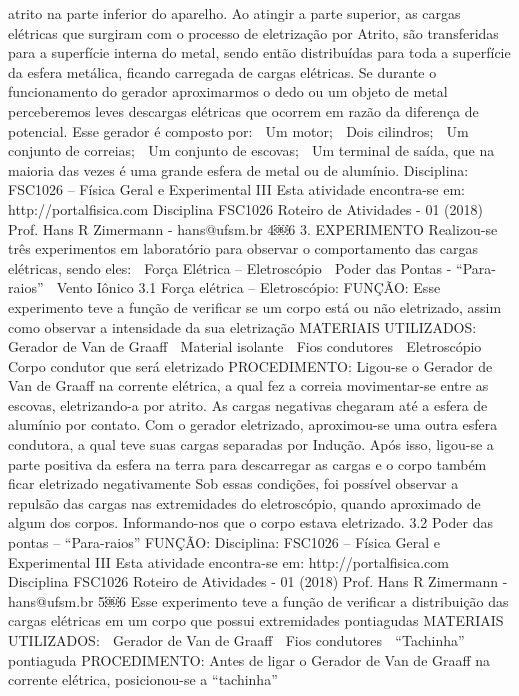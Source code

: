atrito na parte inferior do aparelho. Ao atingir a parte superior, as cargas elétricas que surgiram com 
o processo de eletrização por Atrito, são transferidas para a superfície interna do metal, sendo então 
distribuídas para toda a superfície da esfera metálica, ficando carregada de cargas elétricas. Se 
durante o funcionamento do gerador aproximarmos o dedo ou um objeto de metal perceberemos 
leves descargas elétricas que ocorrem em razão da diferença de potencial. 
Esse gerador é composto por:
 Um motor; 
 Dois cilindros; 
 Um conjunto de correias; 
 Um conjunto de escovas; 
 Um terminal de saída, que na maioria das vezes é uma grande esfera de metal ou de alumínio.
Disciplina: FSC1026 – Física Geral e Experimental III
Esta atividade encontra-se em: http://portalfisica.com Disciplina FSC1026
Roteiro de Atividades - 01 (2018) 
Prof. Hans R Zimermann - hans@ufsm.br
4￼6
3. EXPERIMENTO
Realizou-se três experimentos em laboratório para observar o comportamento das cargas elétricas, 
sendo eles:
 Força Elétrica – Eletroscópio
 Poder das Pontas - “Para-raios”
 Vento Iônico
3.1 Força elétrica – Eletroscópio:
FUNÇÃO:
Esse experimento teve a função de verificar se um corpo está ou não eletrizado, assim como 
observar a intensidade da sua eletrização
MATERIAIS UTILIZADOS: 
 Gerador de Van de Graaff
 Material isolante
 Fios condutores
 Eletroscópio
 Corpo condutor que será eletrizado
PROCEDIMENTO: 
Ligou-se o Gerador de Van de Graaff na corrente elétrica, a qual fez a correia movimentar-se entre 
as escovas, eletrizando-a por atrito. As cargas negativas chegaram até a esfera de alumínio por 
contato.
Com o gerador eletrizado, aproximou-se uma outra esfera condutora, a qual teve suas cargas 
separadas por Indução. Após isso, ligou-se a parte positiva da esfera na terra para descarregar as 
cargas e o corpo também ficar eletrizado negativamente
Sob essas condições, foi possível observar a repulsão das cargas nas extremidades do
eletroscópio, quando aproximado de algum dos corpos. Informando-nos que o corpo estava 
eletrizado.
3.2 Poder das pontas – “Para-raios”
FUNÇÃO:
Disciplina: FSC1026 – Física Geral e Experimental III
Esta atividade encontra-se em: http://portalfisica.com Disciplina FSC1026
Roteiro de Atividades - 01 (2018) 
Prof. Hans R Zimermann - hans@ufsm.br
5￼6
Esse experimento teve a função de verificar a distribuição das cargas elétricas em um corpo que 
possui extremidades pontiagudas
MATERIAIS UTILIZADOS: 
 Gerador de Van de Graaff
 Fios condutores
 “Tachinha” pontiaguda
PROCEDIMENTO:
Antes de ligar o Gerador de Van de Graaff na corrente elétrica, posicionou-se a “tachinha”
